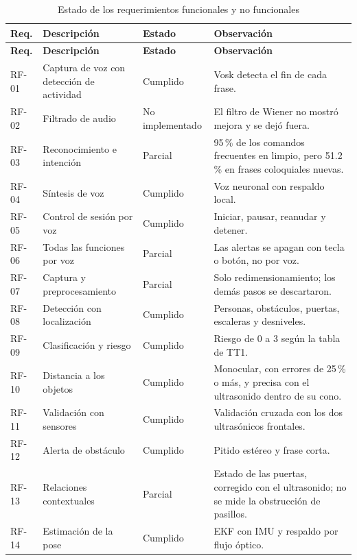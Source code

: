 \begin{longtable}{|p{1.6cm}|p{4.6cm}|p{1.9cm}|p{6.4cm}|}
\caption{Estado de los requerimientos funcionales y no funcionales}
\label{tab:cumplimiento_req} \\
\hline
\textbf{Req.} & \textbf{Descripción} & \textbf{Estado} & \textbf{Observación} \\
\hline
\endfirsthead
\hline
\textbf{Req.} & \textbf{Descripción} & \textbf{Estado} & \textbf{Observación} \\
\hline
\endhead
RF-01 & Captura de voz con detección de actividad & Cumplido & Vosk detecta el fin
de cada frase. \\
\hline
RF-02 & Filtrado de audio & No implementado & El filtro de Wiener no mostró mejora y
se dejó fuera. \\
\hline
RF-03 & Reconocimiento e intención & Parcial & 95\,\% de los comandos frecuentes en
limpio, pero 51.2\,\% en frases coloquiales nuevas. \\
\hline
RF-04 & Síntesis de voz & Cumplido & Voz neuronal con respaldo local. \\
\hline
RF-05 & Control de sesión por voz & Cumplido & Iniciar, pausar, reanudar y
detener. \\
\hline
RF-06 & Todas las funciones por voz & Parcial & Las alertas se apagan con tecla o
botón, no por voz. \\
\hline
RF-07 & Captura y preprocesamiento & Parcial & Solo redimensionamiento; los demás
pasos se descartaron. \\
\hline
RF-08 & Detección con localización & Cumplido & Personas, obstáculos, puertas,
escaleras y desniveles. \\
\hline
RF-09 & Clasificación y riesgo & Cumplido & Riesgo de 0 a 3 según la tabla de TT1. \\
\hline
RF-10 & Distancia a los objetos & Cumplido & Monocular, con errores de 25\,\% o más,
y precisa con el ultrasonido dentro de su cono. \\
\hline
RF-11 & Validación con sensores & Cumplido & Validación cruzada con los dos
ultrasónicos frontales. \\
\hline
RF-12 & Alerta de obstáculo & Cumplido & Pitido estéreo y frase corta. \\
\hline
RF-13 & Relaciones contextuales & Parcial & Estado de las puertas, corregido con el
ultrasonido; no se mide la obstrucción de pasillos. \\
\hline
RF-14 & Estimación de la pose & Cumplido & EKF con IMU y respaldo por flujo
óptico. \\

\end{longtable}
